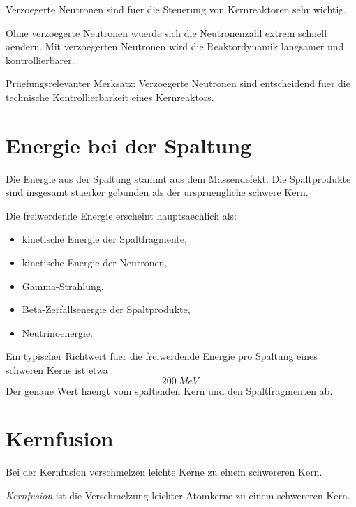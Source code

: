 \begin{conceptbox}
Verzoegerte Neutronen sind fuer die Steuerung von Kernreaktoren sehr wichtig.

Ohne verzoegerte Neutronen wuerde sich die Neutronenzahl extrem schnell aendern.
Mit verzoegerten Neutronen wird die Reaktordynamik langsamer und kontrollierbarer.
\end{conceptbox}

\begin{examtipbox}
Pruefungsrelevanter Merksatz:
Verzoegerte Neutronen sind entscheidend fuer die technische Kontrollierbarkeit eines
Kernreaktors.
\end{examtipbox}

\section{Energie bei der Spaltung}

\begin{conceptbox}
Die Energie aus der Spaltung stammt aus dem Massendefekt.
Die Spaltprodukte sind insgesamt staerker gebunden als der urspruengliche schwere
Kern.

Die freiwerdende Energie erscheint hauptsaechlich als:
\begin{itemize}
    \item kinetische Energie der Spaltfragmente,
    \item kinetische Energie der Neutronen,
    \item Gamma-Strahlung,
    \item Beta-Zerfallsenergie der Spaltprodukte,
    \item Neutrinoenergie.
\end{itemize}
\end{conceptbox}

\begin{notebox}
Ein typischer Richtwert fuer die freiwerdende Energie pro Spaltung eines schweren
Kerns ist etwa
\[
    \SI{200}{MeV}.
\]
Der genaue Wert haengt vom spaltenden Kern und den Spaltfragmenten ab.
\end{notebox}

\section{Kernfusion}

Bei der Kernfusion verschmelzen leichte Kerne zu einem schwereren Kern.

\begin{definitionbox}
\emph{Kernfusion} ist die Verschmelzung leichter Atomkerne zu einem schwereren Kern.
\end{definitionbox}

